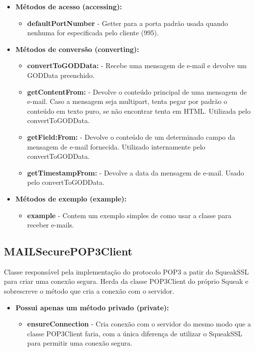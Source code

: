 \begin{itemize}
	\item \textbf{Métodos de acesso (accessing):}
	\begin{itemize}
		\item \textbf{defaultPortNumber} - Getter para a porta padrão usada quando nenhuma for especificada pelo cliente (995).
	\end{itemize}
	\item \textbf{Métodos de conversão (converting):} 
	\begin{itemize}
		\item \textbf{convertToGODData:} - Recebe uma mensagem de e-mail e devolve um GODData preenchido.
		\item \textbf{getContentFrom:} - Devolve o conteúdo principal de uma mensagem de e-mail. Caso a mensagem seja multipart, tenta pegar por padrão o conteúdo em texto puro, se não encontrar tenta em HTML. Utilizada pelo convertToGODData.
		\item \textbf{getField:From:} - Devolve o conteúdo de um determinado campo da mensagem de e-mail fornecida. Utilizado internamente pelo convertToGODData.
		\item \textbf{getTimestampFrom:} - Devolve a data da mensagem de e-mail. Usado pelo convertToGODData.
	\end{itemize}
	\item \textbf{Métodos de exemplo (example):}
	\begin{itemize}
		\item \textbf{example} - Contem um exemplo simples de como usar a classe para receber e-mails.
	\end{itemize}
\end{itemize}

\subsection{MAILSecurePOP3Client}

Classe responsável pela implementação do protocolo POP3 a patir do SqueakSSL para criar uma conexão segura. Herda da classe POP3Client do próprio Squeak e sobrescreve o método que cria a conexão com o servidor.

\begin{itemize}
	\item \textbf{Possui apenas um método privado (private):}
	\begin{itemize}
		\item \textbf{ensureConnection} - Cria conexão com o servidor do mesmo modo que a classe POP3Client faria, com a única diferença de utilizar o SqueakSSL para permitir uma conexão segura.
	\end{itemize}
\end{itemize}


